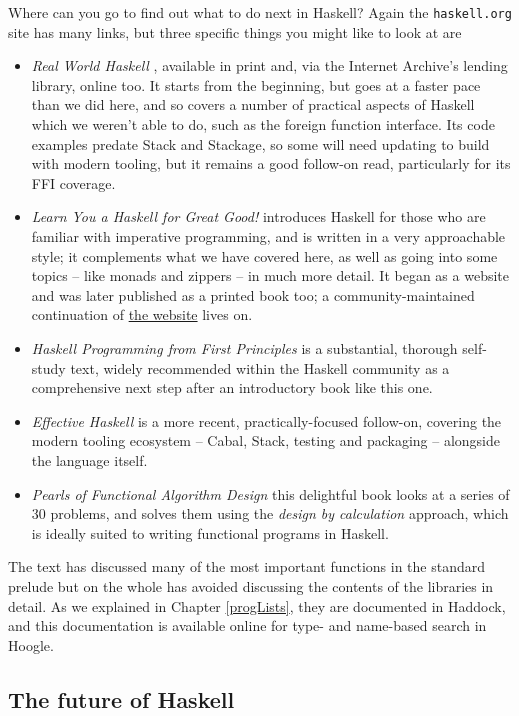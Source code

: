 Where can you go to find out what to do next in Haskell? Again the \texttt{haskell.org} site has many links, but three specific things you might like to look at are 
\begin{itemize}
\item
\emph{Real World Haskell} \cite{realWorldHaskell}, available in print and, via the Internet Archive's lending library, online too. It starts from the beginning, but goes at a faster pace than we did here, and so covers a number of practical aspects of Haskell which we weren't able to do, such as the foreign function interface. Its code examples predate Stack and Stackage, so some will need updating to build with modern tooling, but it remains a good follow-on read, particularly for its FFI coverage.
\item
\emph{Learn You a Haskell for Great Good!} \cite{learnYou} introduces Haskell for those who are familiar with imperative programming, and is written in a very approachable style; it complements what we have covered here, as well as going into some topics -- like monads and zippers -- in much more detail. It began as a website and was later published as a printed book too; a community-maintained continuation of \href{https://learnyouahaskell.github.io/}{the website} lives on.
\item
\emph{Haskell Programming from First Principles} \cite{hpfp} is a substantial, thorough self-study text, widely recommended within the Haskell community as a comprehensive next step after an introductory book like this one.
\item
\emph{Effective Haskell} \cite{effectiveHaskell} is a more recent, practically-focused follow-on, covering the modern tooling ecosystem -- Cabal, Stack, testing and packaging -- alongside the language itself.
\item
\emph{Pearls of Functional Algorithm Design} \cite{BirdPearls} this delightful book looks at a series of 30 problems, and solves them using the \emph{design by calculation} approach, which is ideally suited to writing functional programs in Haskell.
\end{itemize}
The text has discussed many of the most important functions in the
standard prelude but on the whole has avoided discussing the contents
of the libraries in detail. As we explained in Chapter \ref{progLists}, they are documented in Haddock, and this documentation is available online for type- and name-based search in Hoogle.

\subsection*{The future of Haskell}

